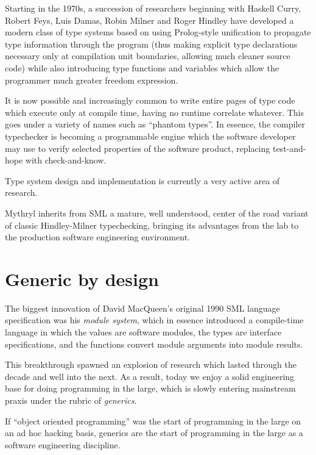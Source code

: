 Starting in the 1970s, a succession of researchers beginning with 
Haskell Curry, Robert Feys, Luis Damas, Robin Milner and Roger Hindley 
have developed a modern class of type systems based on using Prolog-style 
unification to propagate type information through the program (thus 
making explicit type declarations necessary only at compilation unit 
boundaries, allowing much cleaner source code) while also introducing 
type functions and variables which allow the programmer much greater 
freedom expression.

It is now possible and increasingly common to write entire pages of 
type code which execute only at compile time, having no runtime 
correlate whatever.  This goes under a variety of names such as 
``phantom types''.  In essence, the compiler typechecker is becoming a 
programmable engine which the software developer may use to verify 
selected properties of the software product, replacing test-and-hope 
with check-and-know.

Type system design and implementation is currently a very active 
area of research.

Mythryl inherits from {\sc SML} a mature, well understood, center of the road 
variant of classic Hindley-Milner typechecking, bringing its advantages from 
the lab to the production software engineering environment.



\section{Generic by design}

The biggest innovation of David MacQueen's original 1990 {\sc SML} 
language specification was his {\em module system}, which in essence 
introduced a compile-time language in which the values are software 
modules, the types are interface specifications, and the functions 
convert module arguments into module results.

This breakthrough spawned an explosion of research which lasted 
through the decade and well into the next.  As a result, today we 
enjoy a solid engineering base for doing programming in the large, 
which is slowly entering mainstream praxis under the rubric of 
{\em generics}.

If ``object oriented programming'' was the start of programming 
in the large on an ad hoc hacking basis, generics are the start 
of programming in the large as a software engineering discipline. 

